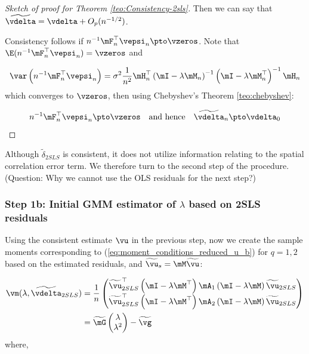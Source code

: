 \documentclass[english,12pt]{book}\usepackage[]{graphicx}\usepackage[]{xcolor}
\begin{document}
\begin{proof}[Sketch of proof for Theorem \ref{teo:Consistency-2sls}]
Then we can say that $\widetilde{\vdelta} = \vdelta + O_p(n^{-1/2})$. 

Consistency follows if $n^{-1}\mF_n^\top\vepsi_n\pto \vzeros$. Note that $\E(n^{-1}\mF_n^\top\vepsi_n) = \vzeros$ and 

\begin{equation*}
\var\left(n^{-1}\mF_n^\top\vepsi_n\right)=\sigma^2\frac{1}{n^2}\mH_n^\top\left(\mI -\lambda\mM_n\right)^{-1}\left(\mI -\lambda\mM_n^\top\right)^{-1} \mH_n 
\end{equation*}
%
which converges to $\vzeros$, then using Chebyshev's Theorem \ref{teo:chebyshev}:

\begin{equation*}
  n^{-1}\mF_n^\top\vepsi_n\pto \vzeros\quad\mbox{and hence}\quad \widetilde{\vdelta}_n\pto\vdelta_0
\end{equation*}


\end{proof}


Although $\widetilde{\delta}_{2SLS}$ is consistent, it does not utilize information relating to the spatial correlation error term. We therefore turn to the second step of the procedure. (Question: Why we cannot use the OLS residuals for the next step?)


\subsubsection{Step 1b: Initial GMM estimator of $\lambda$ based on 2SLS residuals}

Using the consistent estimate $\vu$ in the previous step, now we create the sample moments  corresponding to (\ref{eq:moment_conditions_reduced_u_b}) for $q= 1, 2$ based on the estimated residuals, and $\widetilde{\vu}_s = \mM\widetilde{\vu}$:

\begin{equation}\label{eq:momdent_conditions_step}
	\begin{aligned}
		\vm(\lambda,\widetilde{\vdelta}_{2SLS}) & = \frac{1}{n}
		\begin{pmatrix}
		\widetilde{\vu}_{2SLS}^\top \left(\mI - \lambda\mM^\top\right)\mA_1\left(\mI - \lambda\mM\right)\widetilde{\vu}_{2SLS} \\
		\widetilde{\vu}_{2SLS}^\top \left(\mI - \lambda\mM^\top\right)\mA_2\left(\mI - \lambda\mM\right)\widetilde{\vu}_{2SLS}
		\end{pmatrix} \\
		& = \widetilde{\mG}\begin{pmatrix} \lambda \\
                \lambda^2
\end{pmatrix} - \widetilde{\vg}
	\end{aligned}
\end{equation}
%
where,
\end{document}
